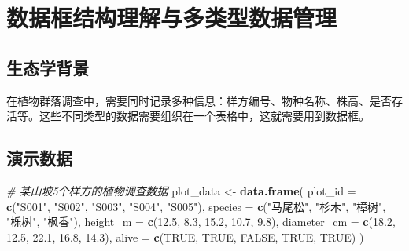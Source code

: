\documentclass[
  twoside]{book}
\newenvironment{Shaded}{\begin{snugshade}}{\end{snugshade}}
\newcommand{\AttributeTok}[1]{\textcolor[rgb]{0.13,0.29,0.53}{#1}}
\newcommand{\CommentTok}[1]{\textcolor[rgb]{0.56,0.35,0.01}{\textit{#1}}}
\newcommand{\ConstantTok}[1]{\textcolor[rgb]{0.56,0.35,0.01}{#1}}
\newcommand{\FloatTok}[1]{\textcolor[rgb]{0.00,0.00,0.81}{#1}}
\newcommand{\FunctionTok}[1]{\textcolor[rgb]{0.13,0.29,0.53}{\textbf{#1}}}
\newcommand{\NormalTok}[1]{#1}
\newcommand{\OtherTok}[1]{\textcolor[rgb]{0.56,0.35,0.01}{#1}}
\newcommand{\StringTok}[1]{\textcolor[rgb]{0.31,0.60,0.02}{#1}}
\begin{document}
\hypertarget{ux6570ux636eux6846ux7ed3ux6784ux7406ux89e3ux4e0eux591aux7c7bux578bux6570ux636eux7ba1ux7406}{%
\section{数据框结构理解与多类型数据管理}\label{ux6570ux636eux6846ux7ed3ux6784ux7406ux89e3ux4e0eux591aux7c7bux578bux6570ux636eux7ba1ux7406}}

\hypertarget{ux751fux6001ux5b66ux80ccux666f-2}{%
\subsection{生态学背景}\label{ux751fux6001ux5b66ux80ccux666f-2}}

在植物群落调查中，需要同时记录多种信息：样方编号、物种名称、株高、是否存活等。这些不同类型的数据需要组织在一个表格中，这就需要用到数据框。

\hypertarget{ux6f14ux793aux6570ux636e-2}{%
\subsection{演示数据}\label{ux6f14ux793aux6570ux636e-2}}

\begin{Shaded}
\begin{Highlighting}[]
\CommentTok{\# 某山坡5个样方的植物调查数据}
\NormalTok{plot\_data }\OtherTok{\textless{}{-}} \FunctionTok{data.frame}\NormalTok{(}
  \AttributeTok{plot\_id =} \FunctionTok{c}\NormalTok{(}\StringTok{"S001"}\NormalTok{, }\StringTok{"S002"}\NormalTok{, }\StringTok{"S003"}\NormalTok{, }\StringTok{"S004"}\NormalTok{, }\StringTok{"S005"}\NormalTok{),}
  \AttributeTok{species =} \FunctionTok{c}\NormalTok{(}\StringTok{"马尾松"}\NormalTok{, }\StringTok{"杉木"}\NormalTok{, }\StringTok{"樟树"}\NormalTok{, }\StringTok{"栎树"}\NormalTok{, }\StringTok{"枫香"}\NormalTok{),}
  \AttributeTok{height\_m =} \FunctionTok{c}\NormalTok{(}\FloatTok{12.5}\NormalTok{, }\FloatTok{8.3}\NormalTok{, }\FloatTok{15.2}\NormalTok{, }\FloatTok{10.7}\NormalTok{, }\FloatTok{9.8}\NormalTok{),}
  \AttributeTok{diameter\_cm =} \FunctionTok{c}\NormalTok{(}\FloatTok{18.2}\NormalTok{, }\FloatTok{12.5}\NormalTok{, }\FloatTok{22.1}\NormalTok{, }\FloatTok{16.8}\NormalTok{, }\FloatTok{14.3}\NormalTok{),}
  \AttributeTok{alive =} \FunctionTok{c}\NormalTok{(}\ConstantTok{TRUE}\NormalTok{, }\ConstantTok{TRUE}\NormalTok{, }\ConstantTok{FALSE}\NormalTok{, }\ConstantTok{TRUE}\NormalTok{, }\ConstantTok{TRUE}\NormalTok{)}
\NormalTok{)}
\end{Highlighting}
\end{Shaded}
\end{document}
